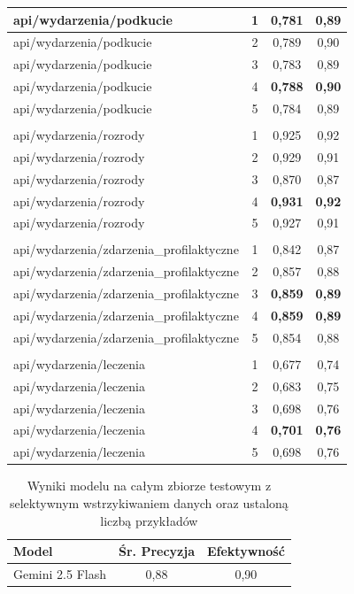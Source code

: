 \begin{table}[H]
\begin{tabular}{|l|c|c|c|}
api/wydarzenia/podkucie & 1 & 0,781 & 0,89 \\ \hline
api/wydarzenia/podkucie & 2 & 0,789 & 0,90 \\ \hline
api/wydarzenia/podkucie & 3 & 0,783 & 0,89 \\ \hline
api/wydarzenia/podkucie & 4 & \textbf{0,788} & \textbf{0,90} \\ \hline
api/wydarzenia/podkucie & 5 & 0,784 & 0,89 \\ \hline
\multicolumn{4}{c}{} \\ \hline


api/wydarzenia/rozrody & 1 & 0,925 & 0,92 \\ \hline
api/wydarzenia/rozrody & 2 & 0,929 & 0,91 \\ \hline
api/wydarzenia/rozrody & 3 & 0,870 & 0,87 \\ \hline
api/wydarzenia/rozrody & 4 & \textbf{0,931} & \textbf{0,92} \\ \hline
api/wydarzenia/rozrody & 5 & 0,927 & 0,91 \\ \hline
\multicolumn{4}{c}{} \\ \hline


api/wydarzenia/zdarzenia\_profilaktyczne & 1 & 0,842 & 0,87 \\ \hline
api/wydarzenia/zdarzenia\_profilaktyczne & 2 & 0,857 & 0,88 \\ \hline
api/wydarzenia/zdarzenia\_profilaktyczne & 3 & \textbf{0,859} & \textbf{0,89} \\ \hline
api/wydarzenia/zdarzenia\_profilaktyczne & 4 & \textbf{0,859} & \textbf{0,89} \\ \hline
api/wydarzenia/zdarzenia\_profilaktyczne & 5 & 0,854 & 0,88 \\ \hline
\multicolumn{4}{c}{} \\ \hline

api/wydarzenia/leczenia & 1 & 0,677 & 0,74 \\ \hline
api/wydarzenia/leczenia & 2 & 0,683 & 0,75 \\ \hline
api/wydarzenia/leczenia & 3 & 0,698 & 0,76 \\ \hline
api/wydarzenia/leczenia & 4 & \textbf{0,701} & \textbf{0,76} \\ \hline
api/wydarzenia/leczenia & 5 & 0,698 & 0,76 \\ \hline

\end{tabular}
\end{table}

\begin{table}[H]
\centering
\caption{Wyniki modelu na całym zbiorze testowym z selektywnym wstrzykiwaniem danych oraz ustaloną liczbą przykładów}
\label{tab:llm_selective_endpoint_gemini}
\begin{tabular}{|l|c|c|}
\hline
\textbf{Model} & \textbf{Śr. Precyzja} & \textbf{Efektywność} \\ \hline
Gemini 2.5 Flash & 0,88 & 0,90 \\ \hline
\end{tabular}
\end{table}

